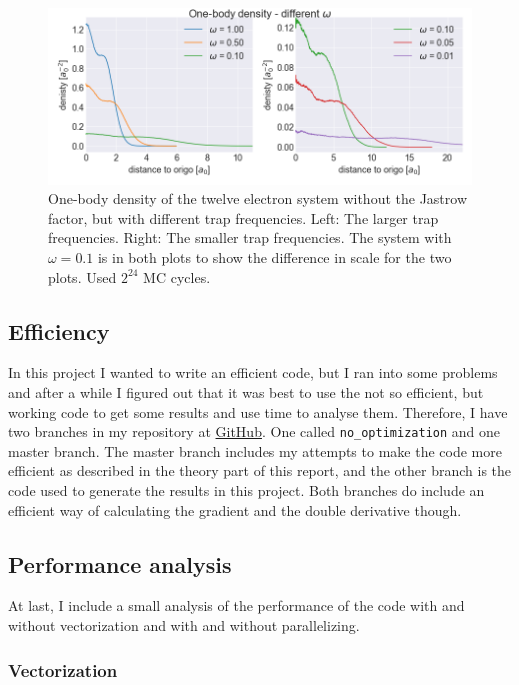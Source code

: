 \begin{figure}[H]
\center
\includegraphics[width=0.85\linewidth]{../Results/one_body_density_no_interaction_12p}\caption{One-body density of the twelve electron system without the Jastrow factor, but with different trap frequencies. Left: The larger trap frequencies. Right: The smaller trap frequencies. The system with $\omega = 0.1$ is in both plots to show the difference in scale for the two plots. Used $2^{24}$ MC cycles. }\label{fig:one_body_density_no_interaction_12p}
\end{figure}

\subsection{Efficiency}

In this project I wanted to write an efficient code, but I ran into some problems and after a while I figured out that it was best to use the not so efficient, but working code to get some results and use time to analyse them. Therefore, I have two branches in my repository at \href{https://github.com/vildemjo/vmc_fermions}{GitHub}. One called \texttt{no\_optimization} and one master branch. The master branch includes my attempts to make the code more efficient as described in the theory part of this report, and the other branch is the code used to generate the results in this project. Both branches do include an efficient way of calculating the gradient and the double derivative though.

\subsection{Performance analysis}

At last, I include a small analysis of the performance of the code with and without vectorization and with and without parallelizing.

\subsubsection{Vectorization}

